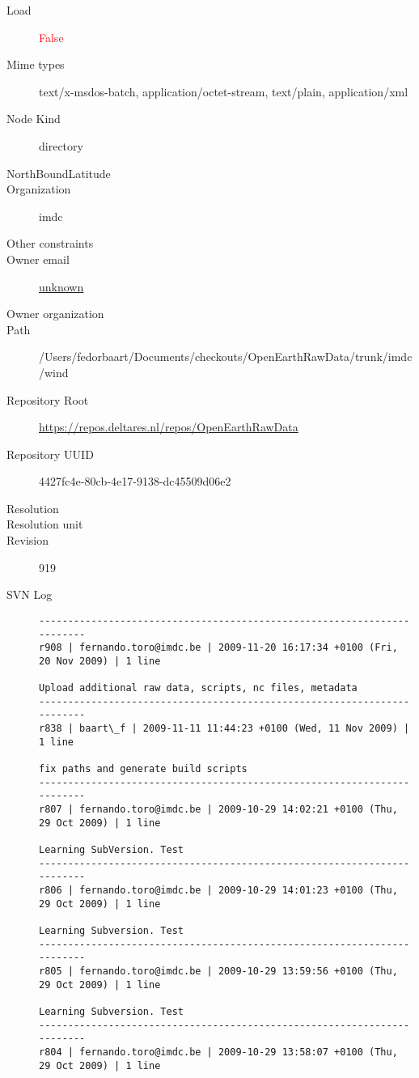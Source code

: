 \documentclass[9]{report}
\begin{document}
\begin{description}
  \item[Load] \textcolor{red}{False}
  \item[Mime types] text/x-msdos-batch, application/octet-stream, text/plain, application/xml
  \item[Node Kind] directory
  \item[NorthBoundLatitude] 
  \item[Organization] imdc
  \item[Other constraints] 
  \item[Owner email] \href{mailto:unknown}{unknown}
  \item[Owner organization] 
  \item[Path] /Users/fedorbaart/Documents/checkouts/OpenEarthRawData/trunk/imdc/wind
  \item[Repository Root] \href{https://repos.deltares.nl/repos/OpenEarthRawData}{https://repos.deltares.nl/repos/OpenEarthRawData}
  \item[Repository UUID] 4427fc4e-80cb-4e17-9138-dc45509d06e2
  \item[Resolution] 
  \item[Resolution unit] 
  \item[Revision] 919
  \item[SVN Log] \begin{verbatim}
------------------------------------------------------------------------
r908 | fernando.toro@imdc.be | 2009-11-20 16:17:34 +0100 (Fri, 20 Nov 2009) | 1 line

Upload additional raw data, scripts, nc files, metadata
------------------------------------------------------------------------
r838 | baart\_f | 2009-11-11 11:44:23 +0100 (Wed, 11 Nov 2009) | 1 line

fix paths and generate build scripts
------------------------------------------------------------------------
r807 | fernando.toro@imdc.be | 2009-10-29 14:02:21 +0100 (Thu, 29 Oct 2009) | 1 line

Learning SubVersion. Test
------------------------------------------------------------------------
r806 | fernando.toro@imdc.be | 2009-10-29 14:01:23 +0100 (Thu, 29 Oct 2009) | 1 line

Learning Subversion. Test
------------------------------------------------------------------------
r805 | fernando.toro@imdc.be | 2009-10-29 13:59:56 +0100 (Thu, 29 Oct 2009) | 1 line

Learning Subversion. Test
------------------------------------------------------------------------
r804 | fernando.toro@imdc.be | 2009-10-29 13:58:07 +0100 (Thu, 29 Oct 2009) | 1 line


\end{verbatim}
\end{description}
\end{document}
